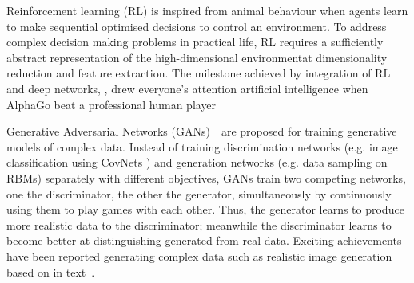 Reinforcement learning (RL) is inspired from animal behaviour when agents learn to make sequential optimised decisions to control an environment.
To address complex decision making problems in practical life, RL requires a sufficiently abstract representation of the high-dimensional environment\DIFdelbegin {}\DIFdelend \DIFaddbegin {}\DIFaddend at dimensionality reduction and feature extraction.
The milestone achieved by \DIFaddbegin {}\DIFaddend integration of RL and deep networks, \DIFdelbegin {}\DIFdelend \DIFaddbegin {}\DIFaddend , drew everyone's attention \DIFdelbegin {}\DIFdelend \DIFaddbegin {}\DIFaddend artificial intelligence when AlphaGo beat a professional human player \DIFdelbegin {}\DIFdelend \DIFaddbegin {}\DIFaddend %

Generative Adversarial Networks (GANs)~~\DIFdelbegin {}\DIFdelend \DIFaddbegin {}\DIFaddend are proposed for training generative models of complex data.
Instead of training discrimination networks (e.g. image classification using CovNets ) and generation networks (e.g. data sampling on RBMs) separately with different objectives, GANs train two competing networks, one the discriminator, the other the generator, simultaneously by continuously using them to play games with each other.
Thus, the generator learns to produce more realistic data to \DIFdelbegin {}\DIFdelend \DIFaddbegin {}\DIFaddend the discriminator; meanwhile the discriminator learns to become better at distinguishing generated from real data.
Exciting achievements have been reported \DIFdelbegin {}\DIFdelend \DIFaddbegin {}\DIFaddend generating complex data such as realistic image generation based on \DIFdelbegin {}\DIFdelend \DIFaddbegin {}\DIFaddend in text~\DIFdelbegin {}\DIFdelend \DIFaddbegin {}\DIFaddend .


